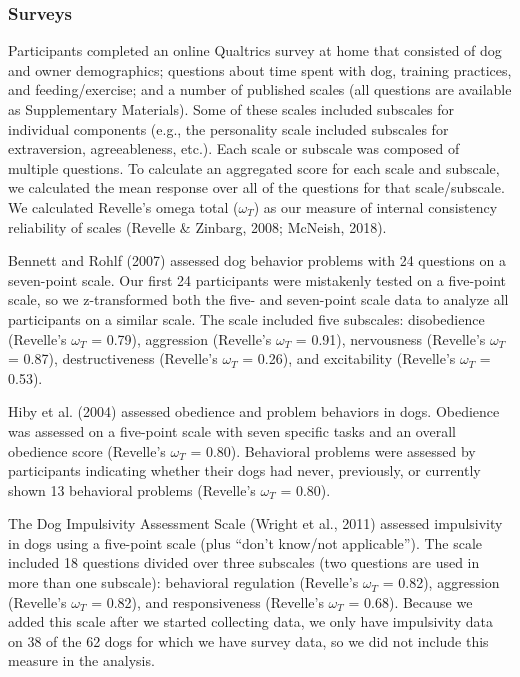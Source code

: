 \documentclass[
  english,
  ,pub,floatsintext]{apa6}
\begin{document}
\hypertarget{surveys}{%
\subsubsection{Surveys}\label{surveys}}

Participants completed an online Qualtrics survey at home that consisted of dog and owner demographics; questions about time spent with dog, training practices, and feeding/exercise; and a number of published scales (all questions are available as Supplementary Materials). Some of these scales included subscales for individual components (e.g., the personality scale included subscales for extraversion, agreeableness, etc.). Each scale or subscale was composed of multiple questions. To calculate an aggregated score for each scale and subscale, we calculated the mean response over all of the questions for that scale/subscale. We calculated Revelle's omega total (\(\omega_{T}\)) as our measure of internal consistency reliability of scales (Revelle \& Zinbarg, 2008; McNeish, 2018).

Bennett and Rohlf (2007) assessed dog behavior problems with 24 questions on a seven-point scale. Our first 24 participants were mistakenly tested on a five-point scale, so we z-transformed both the five- and seven-point scale data to analyze all participants on a similar scale. The scale included five subscales: disobedience (Revelle's \(\omega_{T}\) = 0.79), aggression (Revelle's \(\omega_{T}\) = 0.91), nervousness (Revelle's \(\omega_{T}\) = 0.87), destructiveness (Revelle's \(\omega_{T}\) = 0.26), and excitability (Revelle's \(\omega_{T}\) = 0.53).

Hiby et al. (2004) assessed obedience and problem behaviors in dogs. Obedience was assessed on a five-point scale with seven specific tasks and an overall obedience score (Revelle's \(\omega_{T}\) = 0.80). Behavioral problems were assessed by participants indicating whether their dogs had never, previously, or currently shown 13 behavioral problems (Revelle's \(\omega_{T}\) = 0.80).

The Dog Impulsivity Assessment Scale (Wright et al., 2011) assessed impulsivity in dogs using a five-point scale (plus ``don't know/not applicable''). The scale included 18 questions divided over three subscales (two questions are used in more than one subscale): behavioral regulation (Revelle's \(\omega_{T}\) = 0.82), aggression (Revelle's \(\omega_{T}\) = 0.82), and responsiveness (Revelle's \(\omega_{T}\) = 0.68). Because we added this scale after we started collecting data, we only have impulsivity data on 38 of the 62 dogs for which we have survey data, so we did not include this measure in the analysis.
\end{document}
